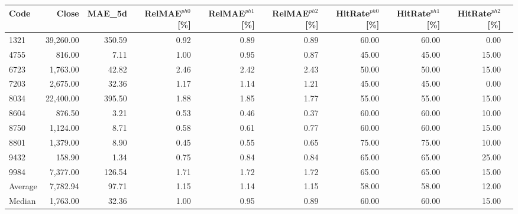 \begingroup
\footnotesize
\begin{tabular}{lrrrrrrrrr}
\hline
Code & Close & MAE\_5d & RelMAE$^{ph0}$[\%] & RelMAE$^{ph1}$[\%] & RelMAE$^{ph2}$[\%] & HitRate$^{ph0}$[\%] & HitRate$^{ph1}$[\%] & HitRate$^{ph2}$[\%] \\
\hline
1321 & 39,260.00 & 350.59 & 0.92 & 0.89 & 0.89 & 60.00 & 60.00 & 0.00 \\
4755 & 816.00 & 7.11 & 1.00 & 0.95 & 0.87 & 45.00 & 45.00 & 15.00 \\
6723 & 1,763.00 & 42.82 & 2.46 & 2.42 & 2.43 & 50.00 & 50.00 & 15.00 \\
7203 & 2,675.00 & 32.36 & 1.17 & 1.14 & 1.21 & 45.00 & 45.00 & 0.00 \\
8034 & 22,400.00 & 395.50 & 1.88 & 1.85 & 1.77 & 55.00 & 55.00 & 15.00 \\
8604 & 876.50 & 3.21 & 0.53 & 0.46 & 0.37 & 60.00 & 60.00 & 10.00 \\
8750 & 1,124.00 & 8.71 & 0.58 & 0.61 & 0.77 & 60.00 & 60.00 & 15.00 \\
8801 & 1,379.00 & 8.90 & 0.45 & 0.55 & 0.65 & 75.00 & 75.00 & 10.00 \\
9432 & 158.90 & 1.34 & 0.75 & 0.84 & 0.84 & 65.00 & 65.00 & 25.00 \\
9984 & 7,377.00 & 126.54 & 1.71 & 1.72 & 1.72 & 65.00 & 65.00 & 15.00 \\
Average & 7,782.94 & 97.71 & 1.15 & 1.14 & 1.15 & 58.00 & 58.00 & 12.00 \\
Median & 1,763.00 & 32.36 & 1.00 & 0.95 & 0.89 & 60.00 & 60.00 & 15.00 \\
\hline
\end{tabular}
\endgroup